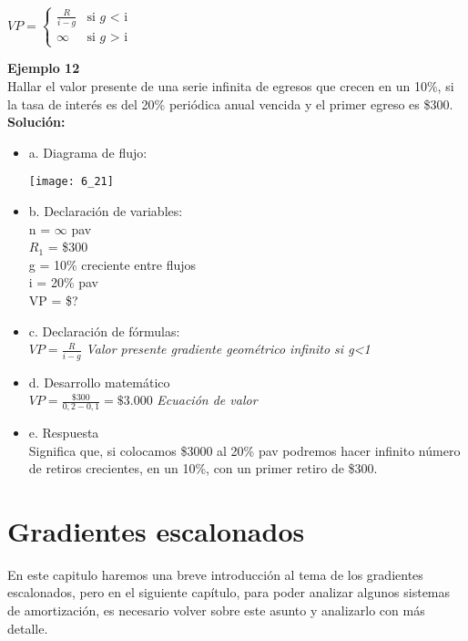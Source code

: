 	\begin{center}
	\fontsize{13}{13}\selectfont
			$VP = \left \{ \begin{matrix}\frac{R}{i-g}& \mbox{si }g\mbox{ <  i}
 \\ \infty & \mbox{si }g\mbox{ >  i}\end{matrix}\right.$
	\end{center}

	
	\textbf{Ejemplo 12}\\
	Hallar el valor presente de una serie infinita de egresos que crecen en un 10\%, si la tasa de interés es del 20\% periódica anual vencida y el primer egreso es \$300.\\
	
	\textbf{Solución:}\\
	\begin{itemize}
		\item a. Diagrama de flujo:\\
		\begin{center}
			\texttt{[image: 6\_21]}
		\end{center}
		\item b. Declaración de variables:\\
		n = $\infty$ \hspace{3 pt} pav\\
		$R_{1}$ = \$300\\
		g = 10\% creciente entre flujos\\
		i = 20\% pav\\
		VP = \$?\\
		\item c. Declaración de fórmulas:\\
		$VP = \frac{R}{i-g}$ \hspace{35 pt} \textit{Valor presente gradiente geométrico infinito si g<1}\\
		\item d. Desarrollo matemático\\
		$VP = \frac{\$300}{0,2-0,1} = \$3.000$ \hspace{35 pt} \textit{Ecuación de valor}\\
		\item e. Respuesta\\
		Significa que, si colocamos \$3000 al 20\% pav podremos hacer infinito número de retiros crecientes, en un 10\%, con un primer retiro de \$300.
	\end{itemize}
	
	\section{Gradientes escalonados}
	En este capitulo haremos una breve introducción al tema de los gradientes escalonados, pero en el siguiente capítulo, para poder analizar algunos sistemas de amortización, es necesario volver sobre este asunto y analizarlo con más detalle.\\
	
